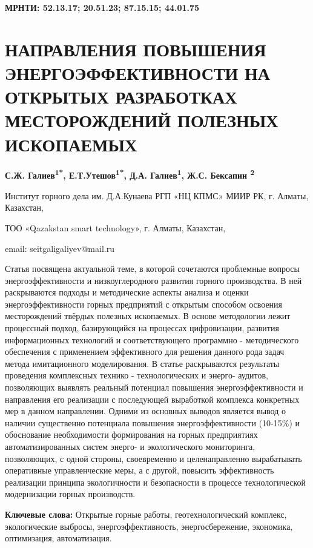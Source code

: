 \clearpage
{\bfseries МРНТИ: 52.13.17; 20.51.23; 87.15.15; 44.01.75}

\section{НАПРАВЛЕНИЯ ПОВЫШЕНИЯ ЭНЕРГОЭФФЕКТИВНОСТИ НА ОТКРЫТЫХ
РАЗРАБОТКАХ МЕСТОРОЖДЕНИЙ ПОЛЕЗНЫХ ИСКОПАЕМЫХ}

\begin{center}
{\bfseries С.Ж. Галиев\textsuperscript{1*}, Е.Т.Утешов\textsuperscript{1*},
Д.А. Галиев\textsuperscript{1}, Ж.С. Бексапин \textsuperscript{2}}

Институт горного дела им. Д.А.Кунаева РГП «НЦ КПМС» МИИР РК, г. Алматы,
Казахстан,

ТОО «Qazakstan smart technology», г. Алматы, Казахстан,

email: seitgaligaliyev@mail.ru
\end{center}

Статья посвящена актуальной теме, в которой сочетаются проблемные
вопросы энергоэффективности и низкоуглеродного развития горного
производства. В ней раскрываются подходы и методические аспекты анализа
и оценки энергоэффективности горных предприятий с открытым способом
освоения месторождений твёрдых полезных ископаемых. В основе методологии
лежит процессный подход, базирующийся на процессах цифровизации,
развития информационных технологий и соответствующего
программно - методического обеспечения с применением эффективного для
решения данного рода задач метода имитационного моделирования. В статье
раскрываются результаты проведения комплексных технико - технологических и
энерго- аудитов, позволяющих выявлять реальный потенциал повышения
энергоэффективности и направления его реализации с последующей
выработкой комплекса конкретных мер в данном направлении. Одними из
основных выводов является вывод о наличии существенно потенциала
повышения энергоэффективности (10-15\%) и обоснование необходимости
формирования на горных предприятиях автоматизированных систем энерго- и
экологического мониторинга, позволяющих, с одной стороны, своевременно и
целенаправленно вырабатывать оперативные управленческие меры, а с
другой, повысить эффективность реализации принципа экологичности и
безопасности в процессе технологической модернизации горных производств.

{\bfseries Ключевые слова:} Открытые горные работы, геотехнологический
комплекс, экологические выбросы, энергоэффективность, энергосбережение, экономика,
оптимизация, автоматизация.

